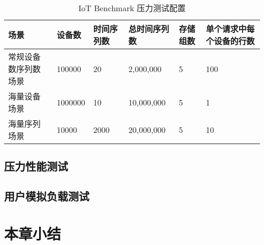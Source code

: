\begin{table}
  \centering
  \caption{IoT Benchmark 压力测试配置}
  \begin{tabular}{p{3cm}llllp{3cm}}
    \toprule 
    场景 & 设备数 & 时间序列数 & 总时间序列数 & 存储组数 & 单个请求中每个设备的行数 \\
    \midrule 
    常规设备数序列数场景 & 100000 & 20 & 2,000,000 & 5 & 100 \\
    海量设备场景 & 1000000 & 10 & 10,000,000 & 5  & 1\\
    海量序列场景 & 10000 & 2000 & 20,000,000 & 5  & 10 \\
    \bottomrule
  \end{tabular}
  \label{tabular:iot-benchmark-config}
\end{table}
\subsection{压力性能测试}
\subsection{用户模拟负载测试}
\section{本章小结}